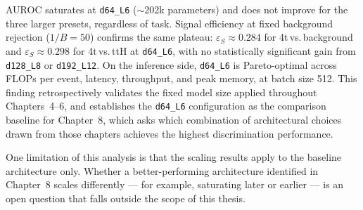 AUROC saturates at \texttt{d64\_L6} ($\sim$202k parameters) and does not improve for the three larger presets, regardless of task. Signal efficiency at fixed background rejection ($1/B = 50$) confirms the same plateau: $\varepsilon_S \approx 0.284$ for 4t\,vs.\,background and $\varepsilon_S \approx 0.298$ for 4t\,vs.\,ttH at \texttt{d64\_L6}, with no statistically significant gain from \texttt{d128\_L8} or \texttt{d192\_L12}. On the inference side, \texttt{d64\_L6} is Pareto-optimal across FLOPs per event, latency, throughput, and peak memory, at batch size 512. This finding retrospectively validates the fixed model size applied throughout Chapters~4--6, and establishes the \texttt{d64\_L6} configuration as the comparison baseline for Chapter~8, which asks which combination of architectural choices drawn from those chapters achieves the highest discrimination performance.

One limitation of this analysis is that the scaling results apply to the baseline architecture only. Whether a better-performing architecture identified in Chapter~8 scales differently — for example, saturating later or earlier — is an open question that falls outside the scope of this thesis.
